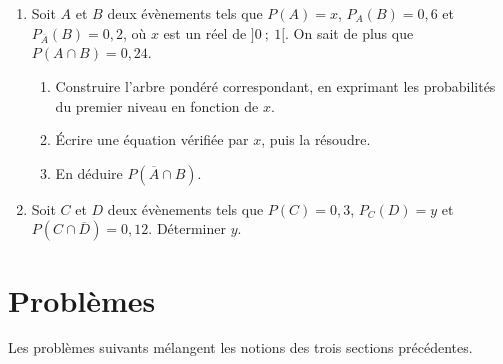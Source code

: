 \documentclass[10pt,a4paper]{article}
\begin{document}
\begin{bloc}
\begin{exo}[][appro]
\begin{enumerate}[leftmargin=*]
    \item Soit \(A\) et \(B\) deux évènements tels que \(P(A)=x\), \(P_A(B)=0,6\) et \(P_{\overline{A}}(B)=0,2\), où \(x\) est un réel de \(]0\ ;\ 1[\). On sait de plus que \(P(A\cap B)=0,24\).
    \begin{enumerate}
        \item Construire l'arbre pondéré correspondant, en exprimant les probabilités du premier niveau en fonction de \(x\).
        \item Écrire une équation vérifiée par \(x\), puis la résoudre.
        \item En déduire \(P(\overline{A}\cap B)\).
    \end{enumerate}
    \item Soit \(C\) et \(D\) deux évènements tels que \(P(C)=0,3\), \(P_C(D)=y\) et \(P(C\cap\overline{D})=0,12\). Déterminer \(y\).
\end{enumerate}
\end{exo}
\end{bloc}


\section{Problèmes}

Les problèmes suivants mélangent les notions des trois sections précédentes.
\nopagebreak
\end{document}
